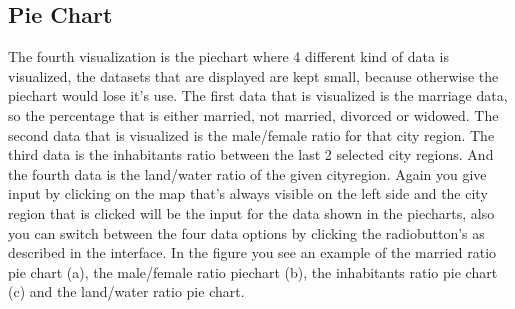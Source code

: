 \documentclass[a4paper,twoside,11pt]{article}
\begin{document}
\subsection{Pie Chart}
The fourth visualization is the piechart where 4 different kind of data is visualized, the datasets that are displayed are kept small, because otherwise the piechart would lose it's use. The first data that is visualized is the marriage data, so the percentage that is either married, not married, divorced or widowed. The second data that is visualized is the male/female ratio for that city region. The third data is the inhabitants ratio between the last 2 selected city regions. And the fourth data is the land/water ratio of the given cityregion. \newline
Again you give input by clicking on the map that's always visible on the left side and the city region that is clicked will be the input for the data shown in the piecharts, also you can switch between the four data options by clicking the radiobutton's as described in the interface. In the figure you see an example of the married ratio pie chart (a), the male/female ratio piechart (b), the inhabitants ratio pie chart (c) and the land/water ratio pie chart.
\end{document}
